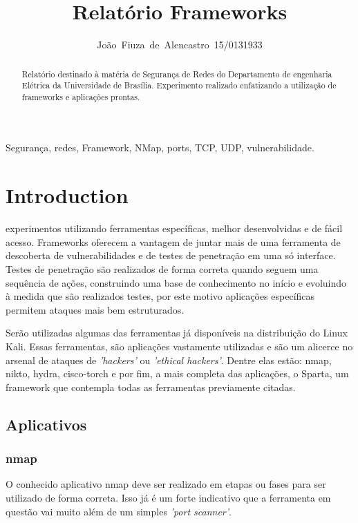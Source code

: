 \documentclass[journal]{IEEEtran}
\begin{document}
\title{Relatório Frameworks}


\author{João~Fiuza~de~Alencastro~15/0131933}%




\maketitle


\begin{abstract}
Relatório destinado à matéria de Segurança de Redes do Departamento de engenharia Elétrica da Universidade de Brasília. Experimento realizado enfatizando a utilização de frameworks e aplicações prontas.
\end{abstract}

\begin{IEEEkeywords}
Segurança, redes, Framework, NMap, ports, TCP, UDP, vulnerabilidade.
\end{IEEEkeywords}


\IEEEpeerreviewmaketitle



\section{Introduction}
 experimentos utilizando ferramentas específicas, melhor desenvolvidas e de fácil acesso. Frameworks oferecem a vantagem de juntar mais de uma ferramenta de descoberta de vulnerabilidades e de testes de penetração em uma só interface. Testes de penetração são realizados de forma correta quando seguem uma sequência de ações, construindo uma base de conhecimento no início e evoluindo à medida que são realizados testes, por este motivo aplicações específicas permitem ataques mais bem estruturados. \par
Serão utilizadas algumas das ferramentas já disponíveis na distribuição do Linux Kali. Essas ferramentas, são aplicações vastamente utilizadas e são um alicerce no arsenal de ataques de \textit{'hackers'} ou \textit{'ethical hackers'}. Dentre elas estão: nmap, nikto, hydra, cisco-torch e por fim, a mais completa das aplicações, o Sparta, um framework que contempla todas as ferramentas previamente citadas.

\subsection{Aplicativos}
\subsubsection{nmap}
O conhecido aplicativo nmap deve ser realizado em etapas ou fases para ser utilizado de forma correta. Isso já é um forte indicativo que a ferramenta em questão vai muito além de um simples \textit{'port scanner'}.
\end{document}
